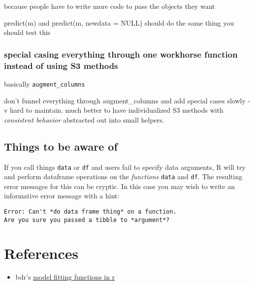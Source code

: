\documentclass[]{book}
\providecommand{\tightlist}{%
  \setlength{\itemsep}{0pt}\setlength{\parskip}{0pt}}
\theoremstyle{definition}
\theoremstyle{definition}
\theoremstyle{definition}
\theoremstyle{remark}
\begin{document}
because people have to write more code to pass the objects they want

predict(m) and predict(m, newdata = NULL) should do the same thing you
should test this

\subsection{special casing everything through one workhorse function
instead of using S3
methods}\label{special-casing-everything-through-one-workhorse-function-instead-of-using-s3-methods}

basically \texttt{augment\_columns}

don't funnel everything through augment\_columns and add special cases
slowly - v hard to maintain. much better to have individualized S3
methods with \emph{consistent behavior} abstracted out into small
helpers.

\section{Things to be aware of}\label{things-to-be-aware-of}

If you call things \texttt{data} or \texttt{df} and users fail to
specify data arguments, R will try and perform dataframe operations on
the \emph{functions} \texttt{data} and \texttt{df}. The resulting error
messages for this can be cryptic. In this case you may wish to write an
informative error message with a hint:

\begin{verbatim}
Error: Can't *do data frame thing* on a function.
Are you sure you passed a tibble to *argument*?
\end{verbatim}

\chapter{References}\label{references}

\begin{itemize}
\tightlist
\item
  bdr's
  \href{https://developer.r-project.org/model-fitting-functions.html}{model
  fitting functions in r}
\end{itemize}


\end{document}
